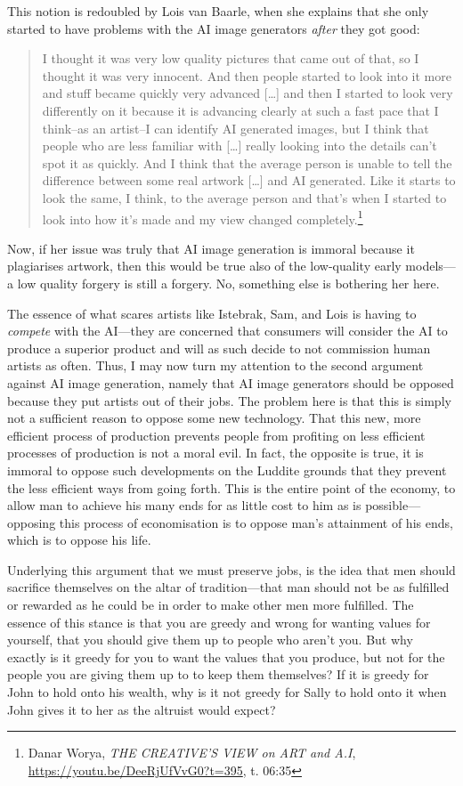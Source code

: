 \documentclass[11pt]{article}
\begin{document}
This notion is redoubled by Lois van Baarle, when she explains that she only started to have problems with the AI image generators \emph{after} they got good:
\begin{quote}
I thought it was very low quality pictures that came out of that, so I thought it was very innocent. And then people started to look into it more and stuff became quickly very advanced [\ldots{}] and then I started to look very differently on it because it is advancing clearly at such a fast pace that I think--as an artist--I can identify AI generated images, but I think that people who are less familiar with [\ldots{}] really looking into the details can't spot it as quickly. And I think that the average person is unable to tell the difference between some real artwork [\ldots{}] and AI generated. Like it starts to look the same, I think, to the average person and that's when I started to look into how it's made and my view changed completely.\footnote{Danar Worya, \emph{THE CREATIVE'S VIEW on ART and A.I}, \url{https://youtu.be/DeeRjUfVvG0?t=395}, t. 06:35}
\end{quote}

Now, if her issue was truly that AI image generation is immoral because it plagiarises artwork, then this would be true also of the low-quality early models---a low quality forgery is still a forgery. No, something else is bothering her here.

The essence of what scares artists like Istebrak, Sam, and Lois is having to \emph{compete} with the AI---they are concerned that consumers will consider the AI to produce a superior product and will as such decide to not commission human artists as often. Thus, I may now turn my attention to the second argument against AI image generation, namely that AI image generators should be opposed because they put artists out of their jobs. The problem here is that this is simply not a sufficient reason to oppose some new technology. That this new, more efficient process of production prevents people from profiting on less efficient processes of production is not a moral evil. In fact, the opposite is true, it is immoral to oppose such developments on the Luddite grounds that they prevent the less efficient ways from going forth. This is the entire point of the economy, to allow man to achieve his many ends for as little cost to him as is possible---opposing this process of economisation is to oppose man's attainment of his ends, which is to oppose his life.

Underlying this argument that we must preserve jobs, is the idea that men should sacrifice themselves on the altar of tradition---that man should not be as fulfilled or rewarded as he could be in order to make other men more fulfilled. The essence of this stance is that you are greedy and wrong for wanting values for yourself, that you should give them up to people who aren't you. But why exactly is it greedy for you to want the values that you produce, but not for the people you are giving them up to to keep them themselves? If it is greedy for John to hold onto his wealth, why is it not greedy for Sally to hold onto it when John gives it to her as the altruist would expect?
\end{document}
